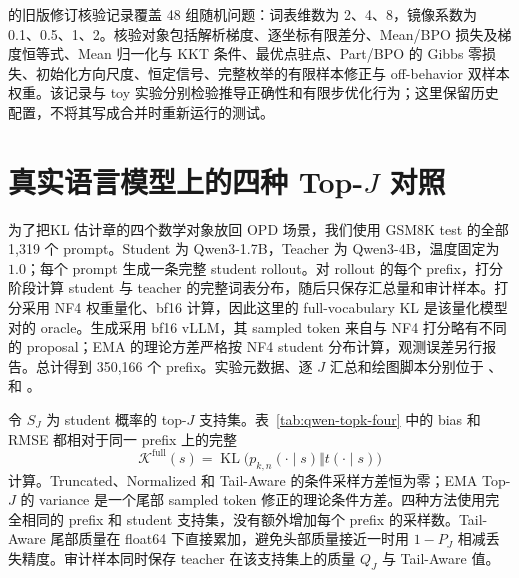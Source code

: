 \documentclass[lang=cn,scheme=chinese,openany]{../book/elegantbook}
\newcommand{\KL}{\operatorname{KL}}
\begin{document}
 的旧版修订核验记录覆盖 48 组随机问题：词表维数为 2、4、8，镜像系数为 0.1、0.5、1、2。核验对象包括解析梯度、逐坐标有限差分、Mean/BPO 损失及梯度恒等式、Mean 归一化与 KKT 条件、最优点驻点、Part/BPO 的 Gibbs 零损失、初始化方向尺度、恒定信号、完整枚举的有限样本修正与 off-behavior 双样本权重。该记录与 toy 实验分别检验推导正确性和有限步优化行为；这里保留历史配置，不将其写成合并时重新运行的测试。

\section{真实语言模型上的四种 \texorpdfstring{Top-$J$}{Top-J} 对照}

为了把KL 估计章的四个数学对象放回 OPD 场景，我们使用 GSM8K test 的全部 1,319 个 prompt。Student 为 Qwen3-1.7B，Teacher 为 Qwen3-4B，温度固定为 $1.0$；每个 prompt 生成一条完整 student rollout。对 rollout 的每个 prefix，打分阶段计算 student 与 teacher 的完整词表分布，随后只保存汇总量和审计样本。打分采用 NF4 权重量化、bf16 计算，因此这里的 full-vocabulary KL 是该量化模型对的 oracle。生成采用 bf16 vLLM，其 sampled token 来自与 NF4 打分略有不同的 proposal；EMA 的理论方差严格按 NF4 student 分布计算，观测误差另行报告。总计得到 350,166 个 prefix。实验元数据、逐 $J$ 汇总和绘图脚本分别位于 、  和 。

令 $S_J$ 为 student 概率的 top-$J$ 支持集。表~\ref{tab:qwen-topk-four} 中的 bias 和 RMSE 都相对于同一 prefix 上的完整
\begin{equation}
 \mathcal K^{\mathrm{full}}(s)=\KL\bigl(p_{k,n}(\cdot\mid s)\Vert t(\cdot\mid s)\bigr)
\end{equation}
计算。Truncated、Normalized 和 Tail-Aware 的条件采样方差恒为零；EMA Top-$J$ 的 variance 是一个尾部 sampled token 修正的理论条件方差。四种方法使用完全相同的 prefix 和 student 支持集，没有额外增加每个 prefix 的采样数。Tail-Aware 尾部质量在 float64 下直接累加，避免头部质量接近一时用 $1-P_J$ 相减丢失精度。审计样本同时保存 teacher 在该支持集上的质量 $Q_J$ 与 Tail-Aware 值。
\end{document}
